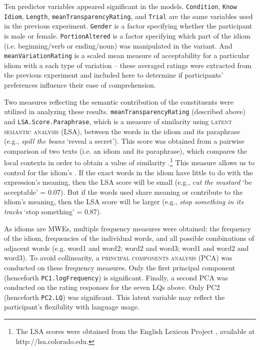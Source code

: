 \documentclass[output=paper
,modfonts
,nonflat]{langsci/langscibook}
\begin{document}
Ten predictor variables appeared significant in the models. \texttt{Condition}, \texttt{Know Idiom}, \texttt{Length}, \texttt{meanTransparencyRating}, and \texttt{Trial} are the same variables used in the previous experiment. \texttt{Gender} is a factor specifying whether the participant is male or female. \texttt{PortionAltered} is a factor specifying which part of the idiom (i.e. beginning/verb or ending/noun) was manipulated in the variant. And \texttt{meanVariationRating} is a scaled mean measure of acceptability for a particular idiom with a each type of variation -- these averaged ratings were extracted from the previous experiment and included here to determine if participants' preferences influence their ease of comprehension.

Two measures reflecting the semantic contribution of the constituents were utilized in analyzing these results. \texttt{meanTransparencyRating} (described above) and \texttt{LSA.Score.Paraphrase}, which is a measure of similarity using \textsc{latent semantic analysis} (LSA), between the words in the idiom and its paraphrase (e.g., \textit{spill the beans} `reveal a secret'). This score was obtained from a pairwise comparison of two texts (i.e. an idiom and its paraphrase), which compares the local contexts in order to obtain a value of similarity \citep{LandauerEtAl1998}.\footnote{The LSA scores were obtained from the English Lexicon Project \citep{BalotaEtAl2007}, available at http://lsa.colorado.edu.} This measure allows us to control for the idiom's . If the exact words in the idiom have little to do with the expression's meaning, then the LSA score will be small (e.g., \textit{cut the mustard} `be acceptable' = 0.07). But if the words used share meaning or contribute to the idiom's meaning, then the LSA score will be larger (e.g., \textit{stop something in its tracks} `stop something' = 0.87).
   
As idioms are MWEs, multiple frequency measures were obtained: the frequency of the idiom, frequencies of the individual words, and all possible combinations of adjacent words (e.g. word1 and word2; word2 and word3; word1 and word2 and word3). To avoid collinearity, a \textsc{principal components analysis} (PCA) was conducted on these frequency measures. Only the first principal component (henceforth \texttt{PC1.logFrequency}) is significant. Finally, a second PCA was conducted on the rating responses for the seven LQs above. Only PC2 (henceforth \texttt{PC2.LQ}) was significant. This latent variable may reflect the participant's flexibility with language usage.
\end{document}
